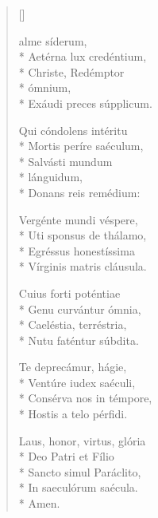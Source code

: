 \newHymn
{}

\pointtrans
\begin{multicols}{2}
\raggedright
\begin{verse}[\versewidth]

 alme síderum,\\*
Aetérna lux credéntium,        \\*      
Christe, Redémptor\\*
\qquad ómnium,       \\*    
Exáudi preces súpplicum. 

Qui cóndolens intéritu    \\*
Mortis períre saéculum,     \\*         
Salvásti mundum\\*
\qquad  lánguidum,    \\*       
Donans reis remédium:    

Vergénte mundi véspere,\\*              
Uti sponsus de thálamo,  \\*            
Egréssus honestíssima      \\*          
Vírginis matris cláusula.

Cuius forti poténtiae  \\*              
Genu curvántur ómnia,    \\*            
Caeléstia, terréstria,      \\*          
Nutu faténtur súbdita.   

Te deprecámur, hágie,\\*%
Ventúre iudex saéculi,         \\*      
Consérva nos in témpore,          \\*    
Hostis a telo pérfidi.   

Laus, honor, virtus, glória\\*
Deo Patri et Fílio\\*
Sancto simul Paráclito,\\*
In saeculórum saécula. \\*
\qquad Amen.


\end{verse}
\end{multicols}

